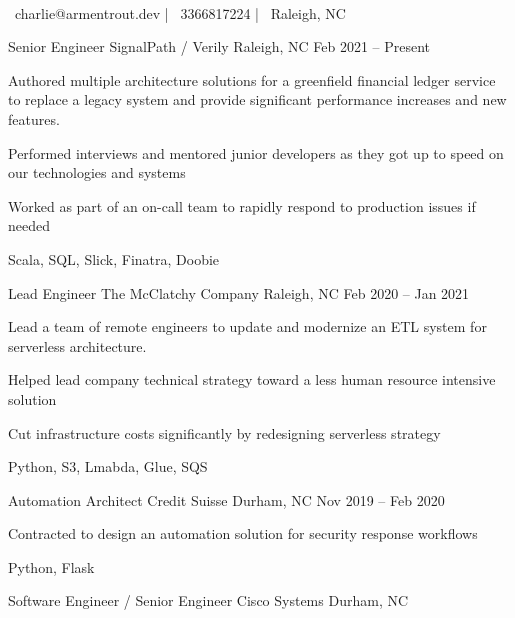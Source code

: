 \documentclass[]{awesome-cv}
\begin{document}
    
\begin{center}
	 \\
	\vspace{2mm}
	{\faEnvelope\ charlie@armentrout.dev} | {\faMobile\ 3366817224} | {\faMapMarker\ Raleigh, NC}
\end{center}
\begin{cventries}
	\cventry
	{Senior Engineer}
	{SignalPath / Verily}
	{Raleigh, NC}
	{Feb 2021 – Present}
	{\begin{cvitems}
		\item {Authored multiple architecture solutions for a greenfield financial ledger service to replace a legacy system and provide significant performance increases and new features.}
		\item {Performed interviews and mentored junior developers as they got up to speed on our technologies and systems}
		\item {Worked as part of an on-call team to rapidly respond to production issues if needed}
		\item {Scala, SQL, Slick, Finatra, Doobie}
		\end{cvitems}}
	\cventry
	{Lead Engineer}
	{The McClatchy Company}
	{Raleigh, NC}
	{Feb 2020 – Jan 2021}
	{\begin{cvitems}
		\item {Lead a team of remote engineers to update and modernize an ETL system for serverless architecture.}
		\item {Helped lead company technical strategy toward a less human resource intensive solution}
		\item {Cut infrastructure costs significantly by redesigning serverless strategy}
		\item {Python, S3, Lmabda, Glue, SQS}
		\end{cvitems}}
	\cventry
	{Automation Architect}
	{Credit Suisse}
	{Durham, NC}
	{Nov 2019 – Feb 2020}
	{\begin{cvitems}
		\item {Contracted to design an automation solution for security response workflows}
		\item {Python, Flask}
		\end{cvitems}}
	\cventry
	{Software Engineer / Senior Engineer}
	{Cisco Systems}
	{Durham, NC}

\end{cventries}
\end{document}
